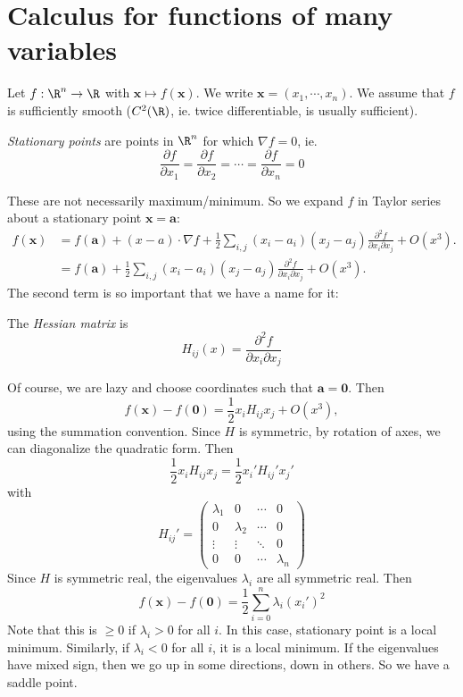 \documentclass[a4paper]{article}
\begin{document}
\section{Calculus for functions of many variables}
Let $f: \R^n \to \R$ with $\mathbf{x} \mapsto f(\mathbf{x})$. We write $\mathbf{x} = (x_1, \cdots, x_n)$. We assume that $f$ is sufficiently smooth ($C^2(\R)$, ie. twice differentiable, is usually sufficient).  
\begin{defi}
  \emph{Stationary points} are points in $\R^n$ for which $\nabla f = 0$, ie.
  \[
    \frac{\partial f}{\partial x_1} = \frac{\partial f}{\partial x_2} = \cdots = \frac{\partial f}{\partial x_n} = 0
  \]
\end{defi}
These are not necessarily maximum/minimum. So we expand $f$ in Taylor series about a stationary point $\mathbf{x} = \mathbf{a}$:
\begin{align*}
  f(\mathbf{x}) &= f(\mathbf{a}) + (x - a)\cdot \nabla f + \frac{1}{2}\sum_{i, j}(x_i - a_i)(x_j - a_j)\frac{\partial^2 f}{\partial x_i \partial x_j} + O(x^3).\\
  &= f(\mathbf{a}) + \frac{1}{2}\sum_{i, j}(x_i - a_i)(x_j - a_j)\frac{\partial^2 f}{\partial x_i \partial x_j} + O(x^3).
\end{align*}
The second term is so important that we have a name for it:
\begin{defi}
  The \emph{Hessian matrix} is
  \[
    H_{ij}(x) = \frac{\partial^2 f}{\partial x_i \partial x_j}
  \]
\end{defi}
Of course, we are lazy and choose coordinates such that $\mathbf{a} = \mathbf{0}$. Then
\[
  f(\mathbf{x}) - f(\mathbf{0}) = \frac{1}{2}x_i H_{ij}x_j + O(x^3),
\]
using the summation convention. Since $H$ is symmetric, by rotation of axes, we can diagonalize the quadratic form. Then
\[
  \frac{1}{2}x_i H_{ij}x_j = \frac{1}{2}x_i' H_{ij}'x_j'
\]
with
\[
  H_{ij}' = 
  \begin{pmatrix}
    \lambda_1 & 0 & \cdots & 0\\
    0 & \lambda_2 & \cdots & 0\\
    \vdots & \vdots & \ddots & 0\\
    0 & 0 & \cdots & \lambda_n
  \end{pmatrix}
\]
Since $H$ is symmetric real, the eigenvalues $\lambda_i$ are all symmetric real. Then
\[
  f(\mathbf{x}) - f(\mathbf{0}) = \frac{1}{2}\sum_{i = 0}^n \lambda_i (x_i')^2
\]
Note that this is $\geq 0$ if $\lambda_i > 0$ for all $i$. In this case, stationary point is a local minimum. Similarly, if $\lambda_i < 0$ for all $i$, it is a local minimum. If the eigenvalues have mixed sign, then we go up in some directions, down in others. So we have a saddle point.
\end{document}
